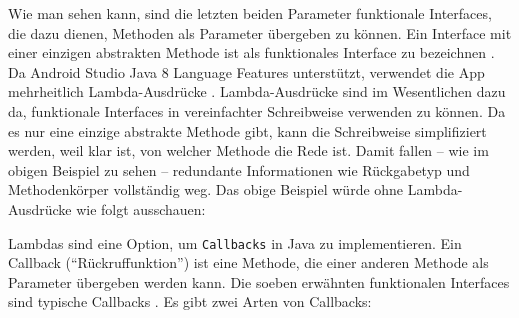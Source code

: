 Wie man sehen kann, sind die letzten beiden Parameter funktionale
Interfaces, die dazu dienen, Methoden als Parameter übergeben zu können.
Ein Interface mit einer einzigen abstrakten Methode ist als funktionales
Interface zu bezeichnen \cite{lambda}. Da Android Studio Java 8 Language
Features unterstützt, verwendet die App mehrheitlich Lambda-Ausdrücke
\cite{java8}. Lambda-Ausdrücke sind im Wesentlichen dazu da, funktionale
Interfaces in vereinfachter Schreibweise verwenden zu können. Da es nur
eine einzige abstrakte Methode gibt, kann die Schreibweise simplifiziert
werden, weil klar ist, von welcher Methode die Rede ist. Damit fallen --
wie im obigen Beispiel zu sehen -- redundante Informationen wie
Rückgabetyp und Methodenkörper vollständig weg. Das obige Beispiel würde
ohne Lambda-Ausdrücke wie folgt ausschauen:

\begin{Shaded}
\begin{Highlighting}[]
  \NormalTok{, }
 \NormalTok{, }\NormalTok{,}
      \NormalTok{() \{}
           \NormalTok{(}
             \CommentTok{// }
\NormalTok{         \}}
\NormalTok{     \},}
      \NormalTok{() \{}
           \NormalTok{(}
             \CommentTok{// }
\NormalTok{         \}}
\NormalTok{     \});}

\NormalTok{();}
\end{Highlighting}
\end{Shaded}

Lambdas sind eine Option, um \texttt{Callbacks} in Java zu
implementieren. Ein Callback (``Rückruffunktion'') ist eine Methode, die
einer anderen Methode als Parameter übergeben werden kann. Die soeben
erwähnten funktionalen Interfaces sind typische Callbacks
\cite{Callbacks}. Es gibt zwei Arten von Callbacks:

